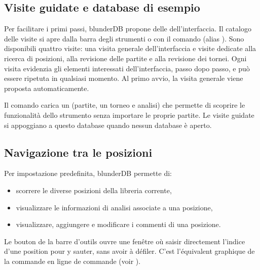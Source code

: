 \documentclass[letterpaper,10pt,italian]{sphinxmanual}
\begin{document}
\subsection{Visite guidate e database di esempio}
\label{\detokenize{manuel:visites-guidees-et-base-d-exemple}}\label{\detokenize{manuel:visites-guidees}}
\sphinxAtStartPar
Per facilitare i primi passi, blunderDB propone delle  dell’interfaccia. Il catalogo delle visite si apre dalla barra degli strumenti o con il comando  (alias ). Sono disponibili quattro visite: una visita generale dell’interfaccia e visite dedicate alla ricerca di posizioni, alla revisione delle partite e alla revisione dei tornei. Ogni visita evidenzia gli elementi interessati dell’interfaccia, passo dopo passo, e può essere ripetuta in qualsiasi momento. Al primo avvio, la visita generale viene proposta automaticamente.

\sphinxAtStartPar
Il comando  carica un  (partite, un torneo e analisi) che permette di scoprire le funzionalità dello strumento senza importare le proprie partite. Le visite guidate si appoggiano a questo database quando nessun database è aperto.


\subsection{Navigazione tra le posizioni}
\label{\detokenize{manuel:navigation-dans-les-positions}}\label{\detokenize{manuel:navigation-positions}}
\sphinxAtStartPar
Per impostazione predefinita, blunderDB permette di:
\begin{itemize}
\item {} 
\sphinxAtStartPar
scorrere le diverse posizioni della libreria corrente,

\item {} 
\sphinxAtStartPar
visualizzare le informazioni di analisi associate a una posizione,

\item {} 
\sphinxAtStartPar
visualizzare, aggiungere e modificare i commenti di una posizione.

\end{itemize}

\sphinxAtStartPar
Le bouton  de la barre d’outils ouvre une fenêtre où
saisir directement l’indice d’une position pour y sauter, sans avoir à
défiler. C’est l’équivalent graphique de la commande \sphinxcode{\sphinxupquote{{[}number{]}}} en ligne de
commande (voir {\hyperref[\detokenize{cmd_mode:cmd-positions}]{}}).
\end{document}
